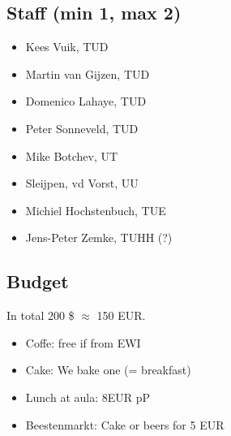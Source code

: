 \documentclass{article}
\begin{document}
\subsection{Staff (min 1, max 2)}
\begin{itemize}
 \item Kees Vuik, TUD
 \item Martin van Gijzen, TUD
 \item Domenico Lahaye, TUD
 \item Peter Sonneveld, TUD
 \item Mike Botchev, UT
 \item Sleijpen, vd Vorst, UU
 \item {\color{red}Michiel Hochstenbuch, TUE}
 \item Jens-Peter Zemke, TUHH (?)
\end{itemize}

\subsection{Budget}
In total 200 \$ $\approx$ 150 EUR.
\begin{itemize}
 \item Coffe: free if from EWI
 \item Cake: We bake one (= breakfast)
 \item Lunch at aula: 8EUR pP
 \item Beestenmarkt: Cake or beers for 5 EUR
\end{itemize}
\end{document}
